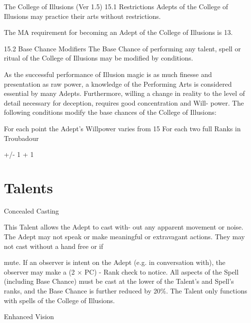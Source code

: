\begin{Chapter}{The College of Illusions (Ver 1.5)}
15.1 Restrictions 
Adepts  of  the  College  of  Illusions  may  practice 
their arts without restrictions. 

The MA requirement for becoming an Adept of the 
College of Illusions is 13. 

15.2 Base Chance Modifiers 
The Base Chance of performing any talent, spell or 
ritual  of  the  College  of  Illusions  may  be  modified 
by conditions. 

As the successful performance of Illusion magic is 
as  much  finesse  and  presentation  as  raw  power,  a 
knowledge  of  the  Performing  Arts  is  considered 
essential  by  many  Adepts.  Furthermore,  willing  a 
change in reality to the level of detail necessary for 
deception,  requires  good  concentration  and  Will-
power.  The  following  conditions  modify  the  base 
chances of the College of Illusions: 

For each point the Adept’s Willpower 
varies from 15 
For each two full Ranks in Troubadour 

 +/- 
1 
+ 1 

\section{Talents}

\begin{talent}[T-1]{Concealed Casting }

\begin{effects}
This Talent allows the Adept to cast with-
out  any  apparent  movement  or  noise.  The  Adept 
may not speak or make meaningful or extravagant 
actions. They may not cast without a hand free or if 

mute. If an observer is intent on the Adept (e.g. in 
conversation  with),  the  observer  may  make  a  (2  × 
PC) - Rank check to notice. All aspects of the Spell 
(including Base Chance) must be cast at the lower 
of  the  Talent’s  and  Spell’s  ranks,  and  the  Base 
Chance is further reduced by 20\%. The Talent only 
functions with spells of the College of Illusions. 

\end{effects}
\end{talent}

\begin{talent}[T-2]{Enhanced Vision }


\end{talent}
\end{Chapter}
